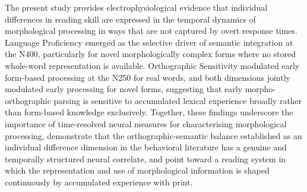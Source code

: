 	The present study provides electrophysiological evidence that individual differences in reading skill are expressed in the temporal dynamics of morphological processing in ways that are not captured by overt response times. Language Proficiency emerged as the selective driver of semantic integration at the N400, particularly for novel morphologically complex forms where no stored whole-word representation is available. Orthographic Sensitivity modulated early form-based processing at the N250 for real words, and both dimensions jointly modulated early processing for novel forms, suggesting that early morpho-orthographic parsing is sensitive to accumulated lexical experience broadly rather than form-based knowledge exclusively. Together, these findings underscore the importance of time-resolved neural measures for characterising morphological processing, demonstrate that the orthographic-semantic balance established as an individual difference dimension in the behavioral literature has a genuine and temporally structured neural correlate, and point toward a reading system in which the representation and use of morphological information is shaped continuously by accumulated experience with print.